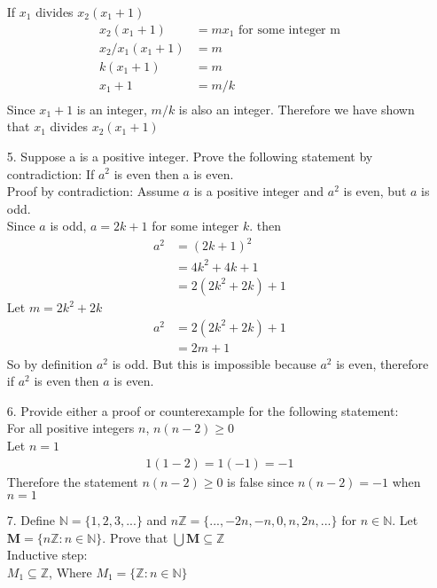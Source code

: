 \documentclass[a4paper,12pt]{article}
\begin{document}
\begin{itemize}
      If $x_1$ divides $x_2(x_1+1)$
      \begin{align*}
        x_2(x_1+1) &= mx_1 \text{ for some integer m}\\
        x_2/x_1(x_1+1) &= m\\
        k(x_1 +1) &= m\\
        x_1 + 1 &= m/k\\
      \end{align*}
      Since $x_1 + 1$ is an integer, $m/k$ is also an integer. Therefore we have shown that $x_1$ divides $x_2(x_1+1)$
      \item[5.] Suppose a is a positive integer. Prove the following statement by contradiction: If $a^2$ is even then a is even.
      \\ 
      Proof by contradiction: Assume $a$ is a positive integer and $a^2$ is even, but $a$ is odd.
      \\
      Since $a$ is odd, $a=2k+1$ for some integer $k$. then
      \begin{align*}
        a^2 &= (2k+1)^2\\
        &= 4k^2 + 4k +1\\
        &=2(2k^2+2k)+1
      \end{align*}
      Let $m=2k^2+2k$
      \begin{align*}
        a^2 &=2(2k^2+2k)+1\\
        &= 2m + 1
      \end{align*}
      So by definition $a^2$ is odd. But this is impossible because $a^2$ is even, therefore if $a^2$ is even then $a$ is even.
      \item[6.] Provide either a proof or counterexample for the following statement:
      \\
      For all positive integers $n$, $n(n-2) \geq 0$
      \\
      Let $n=1$
      \begin{align*}
        1(1-2) = 1(-1) = -1
      \end{align*}
      Therefore the statement $n(n-2) \geq 0$ is false since $n(n-2)=-1$ when $n=1$
      \item[7.] Define $\mathbb{N}=\{1,2,3,...\}$ and $n\mathbb{Z}=\{...,-2n, -n, 0, n, 2n,...\}$ for $n \in \mathbb{N}$. Let $\mathbf{M}=\{n\mathbb{Z}: n \in \mathbb{N}\}$. Prove that $\bigcup \mathbf{M} \subseteq \mathbb{Z}$
      \\
      Inductive step:
      \\
      $M_1 \subseteq \mathbb{Z}$, Where $M_1 = \{\mathbb{Z}: n \in \mathbb{N}\}$ 

\end{itemize}
\end{document}

